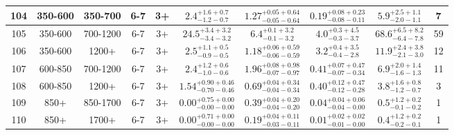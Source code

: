 \documentclass[11pt, oneside]{article}
\begin{document}
\begin{table}
{\begin{tabular}{ |c|c|c|c|c||c|c|c||c|c| }
104 & 350-600 & 350-700 & 6-7 & 3+ & $2.4^{+1.6+0.7}_{-1.2-0.7}$ & $1.27^{+0.05+0.64}_{-0.05-0.64}$ & $0.19^{+0.08+0.23}_{-0.08-0.11}$ & $5.9^{+2.5+1.1}_{-2.0-1.1}$ & 7 \\ \hline
105 & 350-600 & 700-1200 & 6-7 & 3+ & $24.5^{+3.4+3.2}_{-3.4-3.2}$ & $6.4^{+0.1+3.2}_{-0.1-3.2}$ & $4.0^{+0.3+4.5}_{-0.3-3.7}$ & $68.6^{+6.5+8.2}_{-6.4-7.8}$ & 59 \\ \hline
106 & 350-600 & 1200+ & 6-7 & 3+ & $2.5^{+1.1+0.5}_{-0.9-0.5}$ & $1.18^{+0.06+0.59}_{-0.06-0.59}$ & $3.2^{+0.4+3.5}_{-0.4-2.8}$ & $11.9^{+2.4+3.8}_{-2.1-3.0}$ & 12 \\ \hline
107 & 600-850 & 700-1200 & 6-7 & 3+ & $2.4^{+1.2+0.6}_{-1.0-0.6}$ & $1.96^{+0.08+0.98}_{-0.07-0.97}$ & $0.41^{+0.07+0.47}_{-0.07-0.34}$ & $6.9^{+2.0+1.4}_{-1.6-1.3}$ & 11 \\ \hline
108 & 600-850 & 1200+ & 6-7 & 3+ & $1.54^{+0.90+0.46}_{-0.70-0.46}$ & $0.69^{+0.04+0.34}_{-0.04-0.34}$ & $0.40^{+0.12+0.47}_{-0.12-0.28}$ & $3.8^{+1.6+0.8}_{-1.2-0.7}$ & 3 \\ \hline
109 & 850+ & 850-1700 & 6-7 & 3+ & $0.00^{+0.75+0.00}_{-0.00-0.00}$ & $0.39^{+0.04+0.20}_{-0.04-0.20}$ & $0.04^{+0.04+0.06}_{-0.04-0.00}$ & $0.5^{+1.2+0.2}_{-0.1-0.2}$ & 1 \\ \hline
110 & 850+ & 1700+ & 6-7 & 3+ & $0.00^{+0.71+0.00}_{-0.00-0.00}$ & $0.19^{+0.04+0.11}_{-0.03-0.11}$ & $0.01^{+0.02+0.02}_{-0.01-0.00}$ & $0.4^{+1.2+0.2}_{-0.2-0.1}$ & 1 \\ \hline
\end{tabular}}
\end{table}
\end{document}
